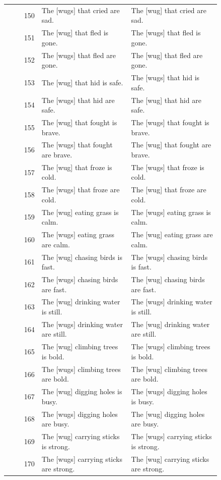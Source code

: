 \begin{longtable}{@{}rp{0.42\linewidth}p{0.42\linewidth}@{}}
150 & The {[}wugs{]} that cried are sad. & The {[}wug{]} that cried are sad. \\
151 & The {[}wug{]} that fled is gone. & The {[}wugs{]} that fled is gone. \\
152 & The {[}wugs{]} that fled are gone. & The {[}wug{]} that fled are gone. \\
153 & The {[}wug{]} that hid is safe. & The {[}wugs{]} that hid is safe. \\
154 & The {[}wugs{]} that hid are safe. & The {[}wug{]} that hid are safe. \\
155 & The {[}wug{]} that fought is brave. & The {[}wugs{]} that fought is brave. \\
156 & The {[}wugs{]} that fought are brave. & The {[}wug{]} that fought are brave. \\
157 & The {[}wug{]} that froze is cold. & The {[}wugs{]} that froze is cold. \\
158 & The {[}wugs{]} that froze are cold. & The {[}wug{]} that froze are cold. \\
159 & The {[}wug{]} eating grass is calm. & The {[}wugs{]} eating grass is calm. \\
160 & The {[}wugs{]} eating grass are calm. & The {[}wug{]} eating grass are calm. \\
161 & The {[}wug{]} chasing birds is fast. & The {[}wugs{]} chasing birds is fast. \\
162 & The {[}wugs{]} chasing birds are fast. & The {[}wug{]} chasing birds are fast. \\
163 & The {[}wug{]} drinking water is still. & The {[}wugs{]} drinking water is still. \\
164 & The {[}wugs{]} drinking water are still. & The {[}wug{]} drinking water are still. \\
165 & The {[}wug{]} climbing trees is bold. & The {[}wugs{]} climbing trees is bold. \\
166 & The {[}wugs{]} climbing trees are bold. & The {[}wug{]} climbing trees are bold. \\
167 & The {[}wug{]} digging holes is busy. & The {[}wugs{]} digging holes is busy. \\
168 & The {[}wugs{]} digging holes are busy. & The {[}wug{]} digging holes are busy. \\
169 & The {[}wug{]} carrying sticks is strong. & The {[}wugs{]} carrying sticks is strong. \\
170 & The {[}wugs{]} carrying sticks are strong. & The {[}wug{]} carrying sticks are strong. \\

\end{longtable}
